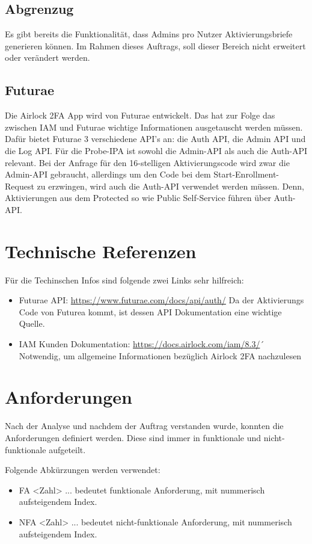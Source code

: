 \subsection{Abgrenzug}
Es gibt bereits die Funktionalität, dass Admins pro Nutzer Aktivierungsbriefe generieren können. Im Rahmen dieses Auftrags, soll dieser Bereich nicht erweitert oder verändert werden.

\subsection{Futurae}
Die Airlock 2FA App wird von Futurae entwickelt. Das hat zur Folge das zwischen IAM und Futurae wichtige Informationen ausgetauscht werden müssen. Dafür bietet Futurae 3 verschiedene API's an: die Auth API, die Admin API und die Log API. Für die Probe-IPA ist sowohl die Admin-API als auch die Auth-API relevant. Bei der Anfrage für den 16-stelligen Aktivierungscode wird zwar die Admin-API gebraucht, allerdings um den Code bei dem Start-Enrollment-Request zu erzwingen, wird auch die Auth-API verwendet werden müssen. Denn, Aktivierungen aus dem Protected so wie Public Self-Service führen über Auth-API. 

\section{Technische Referenzen}
Für die Techinschen Infos sind folgende zwei Links sehr hilfreich:
\begin{itemize}
	\item Futurae API: \url{https://www.futurae.com/docs/api/auth/}\newline
	 Da der Aktivierungs Code von Futurea kommt, ist dessen API Dokumentation eine wichtige Quelle.
	\item IAM Kunden Dokumentation: \url{https://docs.airlock.com/iam/8.3/}´
	Notwendig, um allgemeine Informationen bezüglich Airlock 2FA nachzulesen
\end{itemize}

\section{Anforderungen}
Nach der Analyse und nachdem der Auftrag verstanden wurde, konnten die Anforderungen definiert werden. Diese sind immer in funktionale und nicht-funktionale aufgeteilt.

Folgende Abkürzungen werden verwendet:
\begin{itemize}
	\item FA <Zahl> ... bedeutet funktionale Anforderung, mit nummerisch aufsteigendem Index.
	\item NFA <Zahl> ... bedeutet nicht-funktionale Anforderung, mit nummerisch aufsteigendem Index.
\end{itemize}

